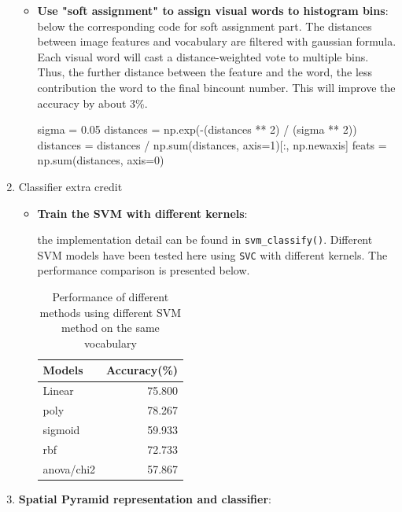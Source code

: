 \begin{enumerate}
          \begin{itemize}
              \item \textbf{Use "soft assignment" to assign visual words to histogram bins}: below the corresponding code for soft assignment part. The distances between image features and vocabulary are filtered with gaussian formula. Each visual word will cast a distance-weighted vote to multiple bins. Thus, the further distance between the feature and the word, the less contribution the word to the final bincount number. This will improve the accuracy by about 3\%.
                    \begin{python}
sigma = 0.05
distances = np.exp(-(distances ** 2) / (sigma ** 2))
distances = distances / np.sum(distances, axis=1)[:, np.newaxis]
feats = np.sum(distances, axis=0)
                    \end{python}
          \end{itemize}
    \item Classifier extra credit
          \begin{itemize}
              \item \textbf{Train the SVM with different kernels}:
              
              the implementation detail can be found in \verb|svm_classify()|.
              Different SVM models have been tested here using \verb|SVC| with different kernels. The performance comparison is presented below.
                    \begin{table}[h]
                        \centering
                        \begin{tabular}{lr}
                            \toprule
                            Models     & Accuracy(\%) \\
                            \midrule
                            Linear     & 75.800       \\
                            poly       & 78.267       \\
                            sigmoid    & 59.933       \\
                            rbf        & 72.733       \\
                            anova/chi2 & 57.867       \\
                            \bottomrule
                        \end{tabular}
                        \caption{Performance of different methods using different SVM method on the same vocabulary}
                        \label{svm}
                    \end{table}
          \end{itemize}
    \item \textbf{Spatial Pyramid representation and classifier}: 
    

\end{enumerate}
